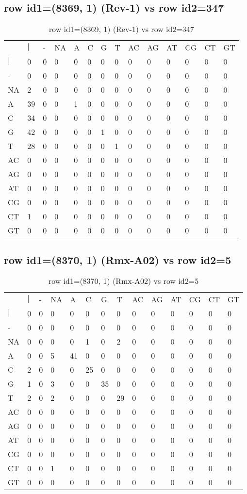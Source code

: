 \subsection{row id1=(8369, 1) (Rev-1) vs row id2=347}
\begin{center}
\begin{longtable}{|l|l|l|l|l|l|l|l|l|l|l|l|l|l|}
\caption{row id1=(8369, 1) (Rev-1) vs row id2=347} \label{table_dm596}\\
\hline
\\
\hline
&$|$&-&NA&A&C&G&T&AC&AG&AT&CG&CT&GT\\
$|$&0&0&0&0&0&0&0&0&0&0&0&0&0\\
-&0&0&0&0&0&0&0&0&0&0&0&0&0\\
NA&2&0&0&0&0&0&0&0&0&0&0&0&0\\
A&39&0&0&1&0&0&0&0&0&0&0&0&0\\
C&34&0&0&0&0&0&0&0&0&0&0&0&0\\
G&42&0&0&0&0&1&0&0&0&0&0&0&0\\
T&28&0&0&0&0&0&1&0&0&0&0&0&0\\
AC&0&0&0&0&0&0&0&0&0&0&0&0&0\\
AG&0&0&0&0&0&0&0&0&0&0&0&0&0\\
AT&0&0&0&0&0&0&0&0&0&0&0&0&0\\
CG&0&0&0&0&0&0&0&0&0&0&0&0&0\\
CT&1&0&0&0&0&0&0&0&0&0&0&0&0\\
GT&0&0&0&0&0&0&0&0&0&0&0&0&0\\
\hline
\end{longtable}
\end{center}

\subsection{row id1=(8370, 1) (Rmx-A02) vs row id2=5}
\begin{center}
\begin{longtable}{|l|l|l|l|l|l|l|l|l|l|l|l|l|l|}
\caption{row id1=(8370, 1) (Rmx-A02) vs row id2=5} \label{table_dm598}\\
\hline
\\
\hline
&$|$&-&NA&A&C&G&T&AC&AG&AT&CG&CT&GT\\
$|$&0&0&0&0&0&0&0&0&0&0&0&0&0\\
-&0&0&0&0&0&0&0&0&0&0&0&0&0\\
NA&0&0&0&0&1&0&2&0&0&0&0&0&0\\
A&0&0&5&41&0&0&0&0&0&0&0&0&0\\
C&2&0&0&0&25&0&0&0&0&0&0&0&0\\
G&1&0&3&0&0&35&0&0&0&0&0&0&0\\
T&2&0&2&0&0&0&29&0&0&0&0&0&0\\
AC&0&0&0&0&0&0&0&0&0&0&0&0&0\\
AG&0&0&0&0&0&0&0&0&0&0&0&0&0\\
AT&0&0&0&0&0&0&0&0&0&0&0&0&0\\
CG&0&0&0&0&0&0&0&0&0&0&0&0&0\\
CT&0&0&1&0&0&0&0&0&0&0&0&0&0\\
GT&0&0&0&0&0&0&0&0&0&0&0&0&0\\
\hline
\end{longtable}
\end{center}


